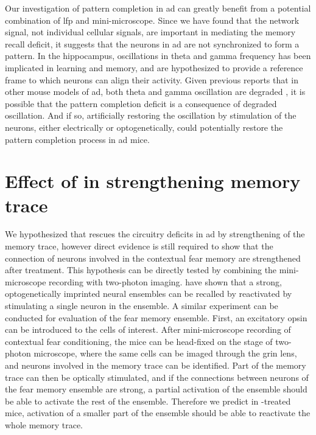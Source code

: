 Our investigation of pattern completion in \gls{ad} can greatly benefit from a potential combination of \gls{lfp} and mini-microscope. Since we have found that the network signal, not individual cellular signals, are important in mediating the memory recall deficit, it suggests that the neurons in \gls{ad} are not synchronized to form a pattern. In the hippocampus, oscillations in theta and gamma frequency has been implicated in learning and memory, and are hypothesized to provide a reference frame to which neurons can align their activity. Given previous reports that in other mouse models of \gls{ad}, both theta and gamma oscillation are degraded \citep{driver07, villette10, scott12, goutagny13}, it is possible that the pattern completion deficit is a consequence of degraded oscillation. And if so, artificially restoring the oscillation by stimulation of the neurons, either electrically or optogenetically, could potentially restore the pattern completion process in \gls{ad} mice. 


\section{Effect of \tglu{} in strengthening memory trace}

We hypothesized that \tglu{} rescues the circuitry deficits in \gls{ad} by strengthening of the memory trace, however direct evidence is still required to show that the connection of neurons involved in the contextual fear memory are strengthened after \tglu{} treatment. This hypothesis can be directly tested by combining the mini-microscope recording with two-photon imaging. \citet{carrillo-reid16} have shown that a strong, optogenetically imprinted neural ensembles can be recalled by reactivated by stimulating a single neuron in the ensemble. A similar experiment can be conducted for evaluation of the fear memory ensemble. First, an excitatory opsin can be introduced to the cells of interest. After mini-microscope recording of contextual fear conditioning, the mice can be head-fixed on the stage of two-photon microscope, where the same cells can be imaged through the \gls{grin} lens, and neurons involved in the memory trace can be identified. Part of the memory trace can then be optically stimulated, and if the connections between neurons of the fear memory ensemble are strong, a partial activation of the ensemble should be able to activate the rest of the ensemble. Therefore we predict in \tglu{}-treated mice, activation of a smaller part of the ensemble should be able to reactivate the whole memory trace. 

